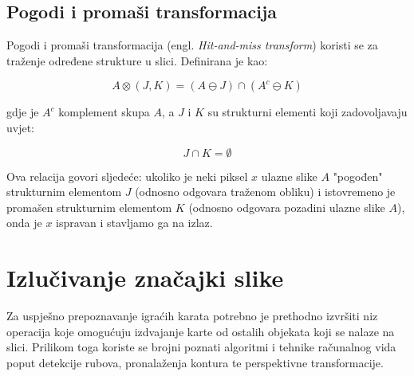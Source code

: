\documentclass[times, zavrsni, numeric, utf8]{fer}
\begin{document}
\subsection{Pogodi i promaši transformacija}
\label{schap:hom}
\hspace*{0.5cm}Pogodi i promaši transformacija (engl. \textit{Hit-and-miss transform}) koristi se za traženje određene strukture u slici. Definirana je kao:
\begin{center}
\begin{equation}
A \otimes (J, K) = (A \ominus J) \cap (A^{c} \ominus K)
\end{equation}
\end{center}
gdje je $A^{c}$ komplement skupa $A$, a $J$ i $K$ su strukturni elementi koji zadovoljavaju uvjet:
\begin{center}
\begin{equation}
J \cap K = \emptyset
\end{equation}
\end{center}
Ova relacija govori sljedeće: ukoliko je neki piksel $x$ ulazne slike $A$ "pogođen" strukturnim elementom $J$ (odnosno odgovara traženom obliku) i istovremeno je promašen strukturnim elementom $K$ (odnosno odgovara pozadini ulazne slike $A$), onda je $x$ ispravan i stavljamo ga na izlaz.

\section{Izlučivanje značajki slike}
\label{schap:extract}
\hspace*{0.5cm}Za uspješno prepoznavanje igraćih karata potrebno je prethodno izvršiti niz operacija koje omogućuju izdvajanje karte od ostalih objekata koji se nalaze na slici. Prilikom toga koriste se brojni poznati algoritmi i tehnike računalnog vida poput detekcije rubova, pronalaženja kontura te perspektivne transformacije. 
\end{document}
